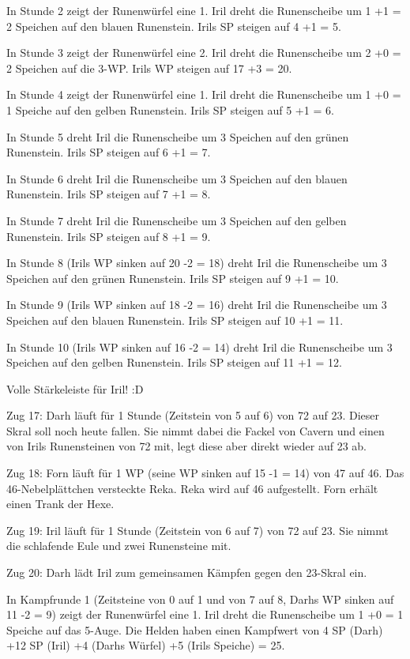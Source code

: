 \documentclass[10pt, a4paper, oneside]{book}
\begin{document}
{In Stunde 2 zeigt der Runenwürfel eine 1. Iril dreht die Runenscheibe um 1 +1 = 2 Speichen auf den blauen Runenstein. Irils SP steigen auf 4 +1 = 5.

In Stunde 3 zeigt der Runenwürfel eine 2. Iril dreht die Runenscheibe um 2 +0 = 2 Speichen auf die 3-WP. Irils WP steigen auf 17 +3 = 20.

In Stunde 4 zeigt der Runenwürfel eine 1. Iril dreht die Runenscheibe um 1 +0 = 1 Speiche auf den gelben Runenstein. Irils SP steigen auf 5 +1 = 6.

In Stunde 5 dreht Iril die Runenscheibe um 3 Speichen auf den grünen Runenstein. Irils SP steigen auf 6 +1 = 7.

In Stunde 6 dreht Iril die Runenscheibe um 3 Speichen auf den blauen Runenstein. Irils SP steigen auf 7 +1 = 8.

In Stunde 7 dreht Iril die Runenscheibe um 3 Speichen auf den gelben Runenstein. Irils SP steigen auf 8 +1 = 9.

In Stunde 8 (Irils WP sinken auf 20 -2 = 18) dreht Iril die Runenscheibe um 3 Speichen auf den grünen Runenstein. Irils SP steigen auf 9 +1 = 10.

In Stunde 9 (Irils WP sinken auf 18 -2 = 16) dreht Iril die Runenscheibe um 3 Speichen auf den blauen Runenstein. Irils SP steigen auf 10 +1 = 11.

In Stunde 10 (Irils WP sinken auf 16 -2 = 14) dreht Iril die Runenscheibe um 3 Speichen auf den gelben Runenstein. Irils SP steigen auf 11 +1 = 12.

Volle Stärkeleiste für Iril! :D



Zug 17: Darh läuft für 1 Stunde (Zeitstein von 5 auf 6) von 72 auf 23. Dieser Skral soll noch heute fallen. Sie nimmt dabei die Fackel von Cavern und einen von Irils Runensteinen von 72 mit, legt diese aber direkt wieder auf 23 ab.



Zug 18: Forn läuft für 1 WP (seine WP sinken auf 15 -1 = 14) von 47 auf 46. Das 46-Nebelplättchen versteckte Reka. Reka wird auf 46 aufgestellt. Forn erhält einen Trank der Hexe.



Zug 19: Iril läuft für 1 Stunde (Zeitstein von 6 auf 7) von 72 auf 23. Sie nimmt die schlafende Eule und zwei Runensteine mit.



Zug 20: Darh lädt Iril zum gemeinsamen Kämpfen gegen den 23-Skral ein.

In Kampfrunde 1 (Zeitsteine von 0 auf 1 und von 7 auf 8, Darhs WP sinken auf 11 -2 = 9) zeigt der Runenwürfel eine 1. Iril dreht die Runenscheibe um 1 +0 = 1 Speiche auf das 5-Auge. Die Helden haben einen Kampfwert von 4 SP (Darh) +12 SP (Iril) +4 (Darhs Würfel) +5 (Irils Speiche) = 25.

}
\end{document}
